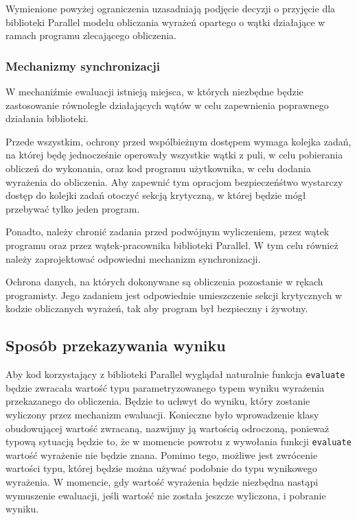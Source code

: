   Wymienione powyżej ograniczenia uzasadniają podjęcie decyzji o przyjęcie dla biblioteki Parallel modelu obliczania wyrażeń opartego o wątki działające w ramach programu zlecającego obliczenia.
  
\subsubsection{Mechanizmy synchronizacji}

  W mechaniźmie ewaluacji istnieją miejsca, w których niezbędne będzie zastosowanie równolegle działających wątów w celu zapewnienia poprawnego działania biblioteki.
 
  Przede wszystkim, ochrony przed wspólbieżnym dostępem wymaga kolejka zadań, na której będę jednocześnie operowały wszystkie wątki z puli, w celu pobierania obliczeń do wykonania, oraz kod programu użytkownika, w celu dodania wyrażenia do obliczenia.
  Aby zapewnić tym opracjom bezpieczeńśtwo wystarczy dostęp do kolejki zadań otoczyć sekcją krytyczną, w której będzie mógł przebywać tylko jeden program.
  
  Ponadto, należy chronić zadania przed podwójnym wyliczeniem, przez wątek programu oraz przez wątek-pracownika biblioteki Parallel. 
  W tym celu również należy zaprojektować odpowiedni mechanizm synchronizacji.
  
  Ochrona danych, na których dokonywane są obliczenia pozostanie w rękach programisty.
  Jego zadaniem jest odpowiednie umieszczenie sekcji krytycznych w kodzie obliczanych wyrażeń, tak aby program był bezpieczny i żywotny.
  
\subsection{Sposób przekazywania wyniku}

  Aby kod korzystający z biblioteki Parallel wyglądał naturalnie funkcja \texttt{evaluate} będzie zwracała wartość typu parametryzowanego typem wyniku wyrażenia przekazanego do obliczenia.
  Będzie to uchwyt do wyniku, który zostanie wyliczony przez mechanizm ewaluacji.
  Konieczne było wprowadzenie klasy obudowującej wartość zwracaną, nazwijmy ją wartością odroczoną, ponieważ typową sytuacją będzie to, że w momencie powrotu z wywołania funkcji \texttt{evaluate} wartość wyrażenie nie będzie znana.
  Pomimo tego, możliwe jest zwrócenie wartości typu, której będzie można używać podobnie do typu wynikowego wyrażenia.
  W momencie, gdy wartość wyrażenia będzie niezbędna nastąpi wymuszenie ewaluacji, jeśli wartość nie została jeszcze wyliczona, i pobranie wyniku.
  

